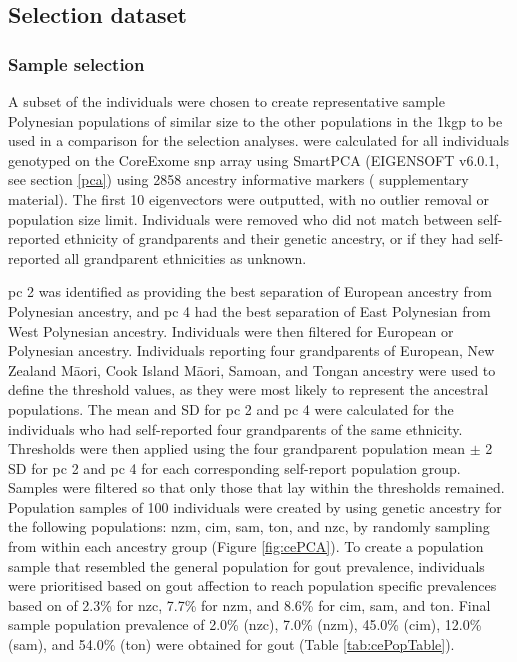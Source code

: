 \documentclass[]{report}
\newcommand{\tex}[1]{#1}
\begin{document}
\subsection{Selection dataset}\label{selectionDataset}

\subsubsection{Sample selection}\label{sample-selection}

A subset of the individuals were chosen to create representative sample
Polynesian populations of similar size to the other populations in the
\gls{1kgp} to be used in a comparison for the selection analyses.
 were calculated for all individuals genotyped on
the CoreExome \gls{snp} array using SmartPCA (EIGENSOFT v6.0.1, see
section \ref{pca}) using 2858 ancestry informative markers
(\citet{Guo2014} supplementary material). The first 10 eigenvectors were
outputted, with no outlier removal or population size limit. Individuals
were removed who did not match between self-reported ethnicity of
grandparents and their genetic ancestry, or if they had self-reported
all grandparent ethnicities as unknown.

\Glsdesc{pc} 2 was identified as providing the best separation of
European ancestry from Polynesian ancestry, and \gls{pc} 4 had the best
separation of East Polynesian from West Polynesian ancestry. Individuals
were then filtered for European or Polynesian ancestry. Individuals
reporting four grandparents of European, New Zealand M\tex{\={a}}ori,
Cook Island M\tex{\={a}}ori, Samoan, and Tongan ancestry were used to
define the threshold values, as they were most likely to represent the
ancestral populations. The mean and SD for \gls{pc} 2 and \gls{pc} 4
were calculated for the individuals who had self-reported four
grandparents of the same ethnicity. Thresholds were then applied using
the four grandparent population mean \(\pm\) 2 SD for \gls{pc} 2 and
\gls{pc} 4 for each corresponding self-report population group. Samples
were filtered so that only those that lay within the thresholds
remained. Population samples of 100 individuals were created by using
genetic ancestry for the following populations: \glsdesc{nzm},
\glsdesc{cim}, \glsdesc{sam}, \glsdesc{ton}, and \glsdesc{nzc}, by
randomly sampling from within each ancestry group (Figure
\ref{fig:cePCA}). To create a population sample that resembled the
general population for gout prevalence, individuals were prioritised
based on gout affection to reach population specific prevalences based
on \citet{Winnard2013} of 2.3\% for \gls{nzc}, 7.7\% for \gls{nzm}, and
8.6\% for \gls{cim}, \gls{sam}, and \gls{ton}. Final sample population
prevalence of 2.0\% (\gls{nzc}), 7.0\% (\gls{nzm}), 45.0\% (\gls{cim}),
12.0\% (\gls{sam}), and 54.0\% (\gls{ton}) were obtained for gout (Table
\ref{tab:cePopTable}).
\end{document}
